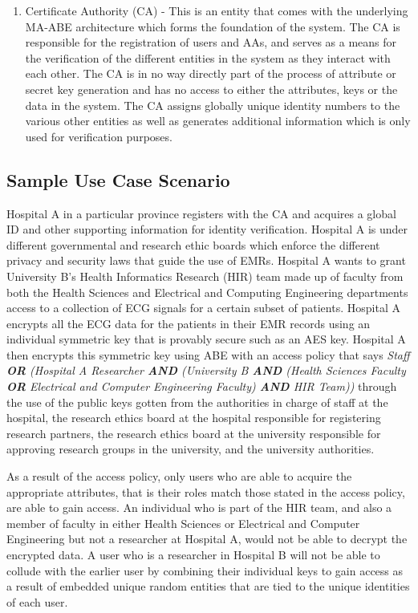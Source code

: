 \begin{enumerate}
\item Certificate Authority (CA) - This is an entity that comes with the underlying MA-ABE architecture which forms the foundation of the system\cite{Yang2013}\cite{Yang2014}. The CA is responsible for the registration of users and AAs, and serves as a means for the verification of the different entities in the system as they interact with each other. The CA is in no way directly part of the process of attribute or secret key generation and has no access to either the attributes, keys or the data in the system. The CA assigns globally unique identity numbers to the various other entities as well as generates additional information which is only used for verification purposes.

\end{enumerate}


\subsection{Sample Use Case Scenario}

Hospital A in a particular province registers with the CA and acquires a global ID and other supporting information for identity verification. Hospital A is under different governmental and research ethic boards which enforce the different privacy and security laws that guide the use of EMRs. Hospital A wants to grant University B's Health Informatics Research (HIR) team made up of faculty from both the Health Sciences and Electrical and Computing Engineering departments access to a collection of ECG signals for a certain subset of patients. Hospital A encrypts all the ECG data for the patients in their EMR records using an individual symmetric key that is provably secure such as an AES key. Hospital A then encrypts this symmetric key using ABE with an access policy that says \textit{Staff \textbf{OR} (Hospital A Researcher \textbf{AND} (University B \textbf{AND} (Health Sciences Faculty \textbf{OR} Electrical and Computer Engineering Faculty) \textbf{AND} HIR Team))} through the use of the public keys gotten from the authorities in charge of staff at the hospital, the research ethics board at the hospital responsible for registering research partners, the research ethics board at the university responsible for approving research groups in the university, and the university authorities.

As a result of the access policy, only users who are able to acquire the appropriate attributes, that is their roles match those stated in the access policy, are able to gain access. An individual who is part of the HIR team, and also a member of faculty in either Health Sciences or Electrical and Computer Engineering but not a researcher at Hospital A, would not be able to decrypt the encrypted data. A user who is a researcher in Hospital B will not be able to collude with the earlier user by combining their individual keys to gain access as a result of embedded unique random entities that are tied to the unique identities of each user.

